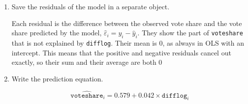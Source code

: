 \documentclass[12pt,letterpaper]{article}
\begin{document}
\begin{enumerate}
		\item Save the residuals of the model in a separate object.
		
		
		
		
		
		\noindent Each residual is the difference between the observed vote share and the vote share predicted by the model, $\hat{\varepsilon}_i = y_i - \hat{y}_i$. They show the part of \texttt{voteshare} that is not explained by \texttt{difflog}. Their mean is 0, as always in OLS with an intercept. This means that the positive and negative residuals cancel out exactly, so their sum and their average are both 0
		
		\item Write the prediction equation.
		
		\[
		\widehat{\texttt{voteshare}}_i = 0.579 + 0.042 \times \texttt{difflog}_i
		\]
	\end{enumerate}
	
\end{document}
